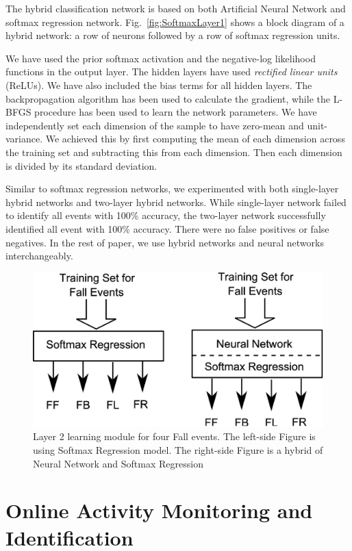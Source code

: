 \documentclass[]{IEEEtran}
\begin{document}
The hybrid classification network is based on both Artificial Neural Network
and softmax regression network. Fig.~\ref{fig:SoftmaxLayer1} shows a block
diagram of a hybrid network: a row of neurons followed by a row of softmax
regression units.  \par We have used the prior softmax activation  and the
negative-log likelihood functions in the output layer. The hidden layers have
used \emph{rectified linear units }(ReLUs).  We have also included the bias
terms for all hidden layers. The backpropagation algorithm\cite{Sarkar1995} has
been used to calculate the gradient, while the L-BFGS procedure has been used
to learn the network parameters. We have independently set each dimension of
the sample to have zero-mean and unit-variance. We achieved this by first
computing the mean of each dimension across the training set and subtracting
this from each dimension. Then each dimension is divided by its standard
deviation.       

Similar to softmax regression networks, we experimented  with both single-layer
hybrid networks and two-layer hybrid networks. While single-layer network
failed to identify all events with 100\% accuracy, the two-layer network
successfully identified all event with 100\% accuracy. There were no false
positives or false negatives. In the rest of paper, we use hybrid networks and
neural networks interchangeably.

\begin{figure}[t]
	\centering
		\includegraphics[width=0.7\columnwidth]{figures/SoftmaxLayer2Fall.eps}
	\caption{Layer 2 learning module for four Fall events. The left-side
Figure is using Softmax Regression model. The right-side Figure is a hybrid of
Neural Network and Softmax Regression } \label{fig:SoftmaxLayer2Fall}
\end{figure}


\section{Online Activity Monitoring and Identification}
\end{document}
